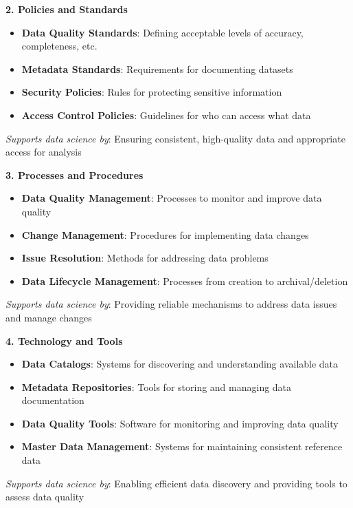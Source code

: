 \documentclass[12pt]{article}
\begin{document}
\begin{enumerate}
\begin{tcolorbox}[colback=blue!5!white,colframe=blue!75!black,title={Solution}]
    \textbf{2. Policies and Standards}
    \begin{itemize}
        \item \textbf{Data Quality Standards}: Defining acceptable levels of accuracy, completeness, etc.
        \item \textbf{Metadata Standards}: Requirements for documenting datasets
        \item \textbf{Security Policies}: Rules for protecting sensitive information
        \item \textbf{Access Control Policies}: Guidelines for who can access what data
    \end{itemize}
    \textit{Supports data science by}: Ensuring consistent, high-quality data and appropriate access for analysis
    
    \textbf{3. Processes and Procedures}
    \begin{itemize}
        \item \textbf{Data Quality Management}: Processes to monitor and improve data quality
        \item \textbf{Change Management}: Procedures for implementing data changes
        \item \textbf{Issue Resolution}: Methods for addressing data problems
        \item \textbf{Data Lifecycle Management}: Processes from creation to archival/deletion
    \end{itemize}
    \textit{Supports data science by}: Providing reliable mechanisms to address data issues and manage changes
    
    \textbf{4. Technology and Tools}
    \begin{itemize}
        \item \textbf{Data Catalogs}: Systems for discovering and understanding available data
        \item \textbf{Metadata Repositories}: Tools for storing and managing data documentation
        \item \textbf{Data Quality Tools}: Software for monitoring and improving data quality
        \item \textbf{Master Data Management}: Systems for maintaining consistent reference data
    \end{itemize}
    \textit{Supports data science by}: Enabling efficient data discovery and providing tools to assess data quality
    

\end{tcolorbox}
\end{enumerate}
\end{document}
